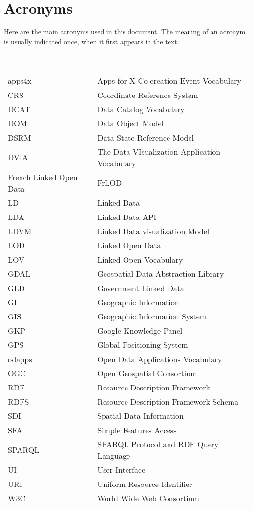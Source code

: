 

\chapter*{Acronyms}

Here are the main acronyms used in this document. The meaning of an acronym is usually indicated once, when it first appears in the text. 

 \\

\begin{longtable}{lp{11cm}}
  &\\
  apps4x	 & Apps for X Co-creation Event Vocabulary\\
  CRS &  Coordinate Reference System\\
  
  DCAT & 	Data Catalog Vocabulary\\
  DOM  & Data Object Model \\
  DSRM & Data State Reference Model \\
  DVIA & The Data VIsualization Application Vocabulary\\
  
  French Linked Open Data & FrLOD \\
  LD  &  Linked Data\\
  LDA &  Linked Data API \\
  LDVM & Linked Data visualization Model \\
  LOD &  Linked Open Data\\ 
  
  
  LOV &  Linked Open Vocabulary\\
  
  GDAL& Geospatial Data Abstraction Library \\
  GLD &  Government Linked Data\\
  GI  &  Geographic Information\\
  GIS &  Geographic Information System\\
  GKP &  Google Knowledge Panel \\
  GPS &  Global Positioning System \\
  
  odapps	 & Open Data Applications Vocabulary\\
  OGC &  Open Geospatial Consortium\\
  
  RDF &  Resource Description Framework\\
  RDFS & Resource Description Framework Schema\\
  SDI  & Spatial Data Information\\
  SFA & Simple Features Access \\
  SPARQL	 & SPARQL Protocol and RDF Query Language\\
  UI  & User Interface \\
  URI &	Uniform Resource Identifier\\
  
  W3C & World Wide Web Consortium \\
  







  
  
 
\end{longtable}
